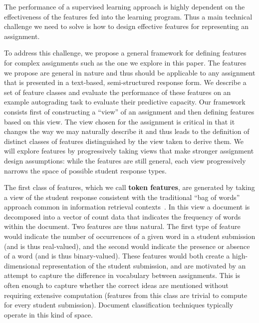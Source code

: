 The performance of a supervised learning approach is highly dependent on 
the effectiveness of the features fed into the learning program. Thus a main technical 
challenge we need to solve is how to design effective features for representing
an assignment. 

To address this challenge, we propose a general framework for defining features for complex
assignments such as the one we explore in this paper. The features we
propose are general in nature and thus should be applicable to any
assignment that is presented in a text-based, semi-structured response
form. We describe a set of feature classes and evaluate the performance of
these features on an example autograding task to evaluate their predictive
capacity. Our framework consists first of constructing a ``view'' of an
assignment and then defining features based on this view. The view chosen
for the assignment is critical in that it changes the way we may naturally
describe it and thus leads to the definition of distinct classes of
features distinguished by the view taken to derive them. We will explore
features by progressively taking views that make stronger assignment design
assumptions: while the features are still general, each view progressively
narrows the space of possible student response types.

The first class of features, which we call \textbf{token features}, are
generated by taking a view of the student response consistent with the
traditional ``bag of words'' approach common in information retrieval
contexts~\cite{Salton:1975:VSM}. In this view a document is decomposed into
a vector of count data that indicates the frequency of words within the
document. Two features are thus natural. The first type of feature would
indicate the number of occurrences of a given word in a student submission
(and is thus real-valued), and the second would indicate the presence or
absence of a word (and is thus binary-valued). These features would both
create a high-dimensional representation of the student submission, and are
motivated by an attempt to capture the difference in vocabulary between
assignments. This is often enough to capture whether the correct ideas are
mentioned without requiring extensive computation (features from this class
are trivial to compute for every student submission). Document
classification techniques typically operate in this kind of space.

